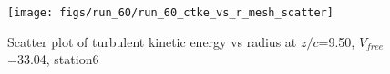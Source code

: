\begin{figure}[H]
\centering
\texttt{[image: figs/run\_60/run\_60\_ctke\_vs\_r\_mesh\_scatter]}
\caption{Scatter plot of turbulent kinetic energy vs radius at $z/c$=9.50, $V_{free}$=33.04, station6}
\label{fig:run_60_ctke_vs_r_mesh_scatter}
\end{figure}


